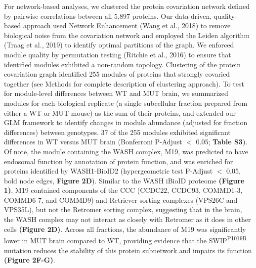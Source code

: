 For network-based analyses, we clustered the protein covariation network defined
by pairwise correlations between all 5,897 proteins. Our data-driven,
quality-based approach used Network Enhancement (Wang et al., 2018) to remove
biological noise from the covariation network and employed the Leiden algorithm
(Traag et al., 2019) to identify optimal partitions of the graph. We enforced
module quality by permutation testing (Ritchie et al., 2016) to ensure that
identified modules exhibited a non-random topology. Clustering of the protein
covariation graph identified 255 modules of proteins that strongly covaried
together (see Methods for complete description of clustering approach). 
To test for module-level differences between WT and MUT brain, we summarized
modules for each biological replicate (a single subcellular fraction prepared
from either a WT or MUT mouse) as the sum of their proteins, and extended our
GLM framework to identify changes in module abundance (adjusted for fraction
differences) between genotypes. 37 of the 255 modules exhibited significant
differences in WT versus MUT brain (Bonferroni P-Adjust $<$ 0.05; \textbf{Table S3}). 
Of note, the module containing the WASH complex, M19, was predicted to have
endosomal function by annotation of protein function, and was enriched for
proteins identified by WASH1-BioID2 (hypergeometric test P-Adjust $<$ 0.05, bold
node edges, \textbf{Figure 2D}). Similar to the WASH iBioID proteome \textbf{(Figure 1)}, M19
contained components of the CCC (CCDC22, CCDC93, COMMD1-3, COMMD6-7, and COMMD9)
and Retriever sorting complexes (VPS26C and VPS35L), but not the Retromer
sorting complex, suggesting that in the brain, the WASH complex may not interact
as closely with Retromer as it does in other cells \textbf{(Figure 2D)}. Across all
fractions, the abundance of M19 was significantly lower in MUT brain compared to
WT, providing evidence that the SWIP\textsuperscript{P1019R} mutation reduces the stability of
this protein subnetwork and impairs its function \textbf{(Figure 2F-G)}. 

